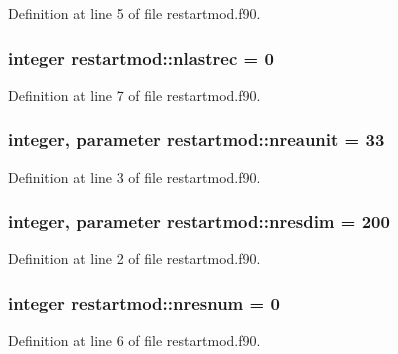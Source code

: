 \-Definition at line 5 of file restartmod.\-f90.

\hypertarget{classrestartmod_a77d97f720a628d5e57e7589cd1dbc7c8}{
\subsubsection[{nlastrec}]{\setlength{\rightskip}{0pt plus 5cm}integer {\bf restartmod\-::nlastrec} = 0}}
\label{classrestartmod_a77d97f720a628d5e57e7589cd1dbc7c8}


\-Definition at line 7 of file restartmod.\-f90.

\hypertarget{classrestartmod_a52e198eada6191afcaadc69e5e5095bd}{
\subsubsection[{nreaunit}]{\setlength{\rightskip}{0pt plus 5cm}integer, parameter {\bf restartmod\-::nreaunit} = 33}}
\label{classrestartmod_a52e198eada6191afcaadc69e5e5095bd}


\-Definition at line 3 of file restartmod.\-f90.

\hypertarget{classrestartmod_a119672601ee8ad1243340351dc2faf68}{
\subsubsection[{nresdim}]{\setlength{\rightskip}{0pt plus 5cm}integer, parameter {\bf restartmod\-::nresdim} = 200}}
\label{classrestartmod_a119672601ee8ad1243340351dc2faf68}


\-Definition at line 2 of file restartmod.\-f90.

\hypertarget{classrestartmod_a45dcb9f30f8dfa87fcbf479bf0faee46}{
\subsubsection[{nresnum}]{\setlength{\rightskip}{0pt plus 5cm}integer {\bf restartmod\-::nresnum} = 0}}
\label{classrestartmod_a45dcb9f30f8dfa87fcbf479bf0faee46}


\-Definition at line 6 of file restartmod.\-f90.

